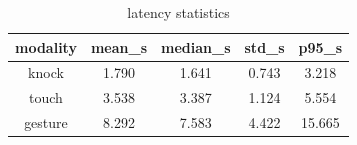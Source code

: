 \begin{table}[h]
\centering
\begin{tabular}{|c|c|c|c|c|}
\hline
modality & mean_s & median_s & std_s & p95_s \\ \hline
knock & 1.790 & 1.641 & 0.743 & 3.218 \\
touch & 3.538 & 3.387 & 1.124 & 5.554 \\
gesture & 8.292 & 7.583 & 4.422 & 15.665 \\
\hline
\end{tabular}
\caption{latency statistics}
\label{tab:T06}
\end{table}
